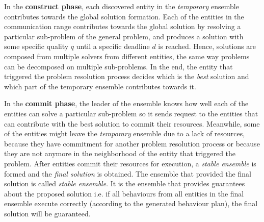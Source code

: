 \documentclass[journal]{IEEEtran}
\theoremstyle{definition}
\begin{document}
 In the \textbf{construct phase}, each discovered entity in the \textit{temporary} ensemble contributes towards the global solution formation.
 Each of the entities in the communication range contributes towards the global solution by resolving a particular sub-problem of the general problem, and produces a solution with some specific quality $q$ until a specific deadline $d$ is reached. Hence, solutions are composed from multiple solvers from different entities, the same way problems can be decomposed on multiple sub-problems. In the end, the entity that triggered the problem resolution process  decides which is the \textit{best} solution and which part of the temporary ensemble contributes towards it.
 
In the \textbf{commit phase}, the leader of the ensemble knows how well each of the entities can solve a particular sub-problem so it sends request to the entities that can contribute with the best solution to commit their resources. 
Meanwhile, some of the entities might leave the \textit{temporary} ensemble due to a lack of resources, because they have commitment for another problem resolution process or because they are not anymore in the neighborhood of the entity that triggered the problem.
After entities commit their resources for execution,   a \textit{stable ensemble} is formed and the \textit{final solution} is obtained.
The ensemble that provided the final solution is called \textit{stable ensemble}. It is the ensemble that provides guarantees about the proposed solution i.e. if all behaviours from all entities in the final ensemble execute correctly (according to the generated behaviour plan), the final solution will be guaranteed.
\end{document}
